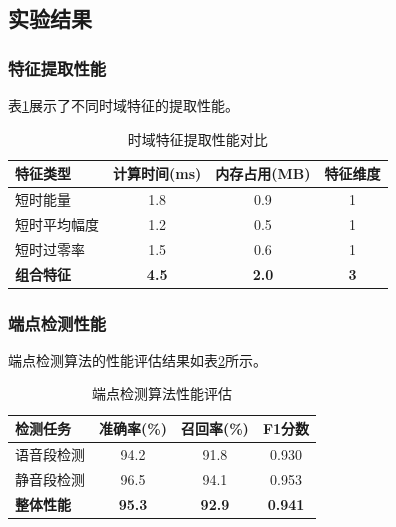 \documentclass[sigconf,nonacm]{acmart}
\begin{document}

\subsection{实验结果}

\subsubsection{特征提取性能}

表\ref{tab:feature_performance}展示了不同时域特征的提取性能。

\begin{table}[htbp]
\caption{时域特征提取性能对比}
\label{tab:feature_performance}
\begin{center}
\begin{tabular}{lccc}
\toprule
\textbf{特征类型} & \textbf{计算时间(ms)} & \textbf{内存占用(MB)} & \textbf{特征维度} \\
\midrule
短时能量 & 1.8 & 0.9 & 1 \\
短时平均幅度 & 1.2 & 0.5 & 1 \\
短时过零率 & 1.5 & 0.6 & 1 \\
\midrule
\textbf{组合特征} & \textbf{4.5} & \textbf{2.0} & \textbf{3} \\
\bottomrule
\end{tabular}
\end{center}
\end{table}

\subsubsection{端点检测性能}

端点检测算法的性能评估结果如表\ref{tab:endpoint_performance}所示。

\begin{table}[htbp]
\caption{端点检测算法性能评估}
\label{tab:endpoint_performance}
\begin{center}
\begin{tabular}{lccc}
\toprule
\textbf{检测任务} & \textbf{准确率(\%)} & \textbf{召回率(\%)} & \textbf{F1分数} \\
\midrule
语音段检测 & 94.2 & 91.8 & 0.930 \\
静音段检测 & 96.5 & 94.1 & 0.953 \\
\midrule
\textbf{整体性能} & \textbf{95.3} & \textbf{92.9} & \textbf{0.941} \\
\bottomrule
\end{tabular}
\end{center}
\end{table}
\end{document}
